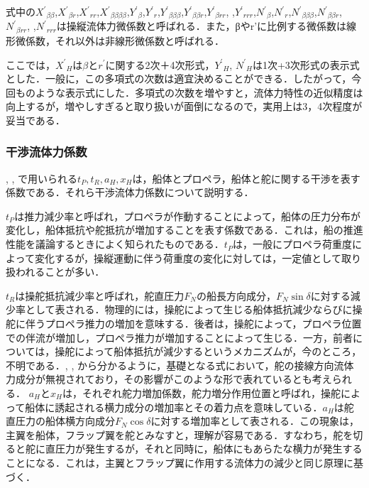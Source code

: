 式中の${X^{\prime}}_{\beta \beta}$,${X^{\prime}}_{\beta r}$,${X^{\prime}}_{r r}$,${X^{\prime}}_{\beta\beta\beta\beta}$,${Y^{\prime}}_{\beta}$,${Y^{\prime}}_{r}$,${Y^{\prime}}_{\beta \beta \beta}$,${Y^{\prime}}_{\beta \beta r}$,${Y^{\prime}}_{\beta r r}$, ,${Y^{\prime}}_{r r r}$,${N^{\prime}}_{\beta}$,${N^{\prime}}_{r}$,${N^{\prime}}_{\beta \beta \beta}$,${N^{\prime}}_{\beta \beta r}$,${N^{\prime}}_{\beta r r}$, ,${N^{\prime}}_{r r r}$は操縦流体力微係数と呼ばれる．また，βやr'に比例する微係数は線形微係数，それ以外は非線形微係数と呼ばれる．

ここでは，${X^{\prime}}_H$は$\beta$と$r^{\prime}$に関する2次＋4次形式，${Y^{\prime}}_H$, ${N^{\prime}}_H$は1次+3次形式の表示式とした．一般に，この多項式の次数は適宜決めることができる．したがって，今回ものような表示式にした．多項式の次数を増やすと，流体力特性の近似精度は向上するが，増やしすぎると取り扱いが面倒になるので，実用上は3，4次程度が妥当である．

\subsubsection{干渉流体力係数}

, , で用いられる$t_P,t_R,a_H,x_H$は，船体とプロペラ，船体と舵に関する干渉を表す係数である．それら干渉流体力係数について説明する．

$t_P$は推力減少率と呼ばれ，プロペラが作動することによって，船体の圧力分布が変化し，船体抵抗や舵抵抗が増加することを表す係数である．これは，船の推進性能を議論するときによく知られたものである．$t_P$は，一般にプロペラ荷重度によって変化するが，操縦運動に伴う荷重度の変化に対しては，一定値として取り扱われることが多い．

$t_R$は操舵抵抗減少率と呼ばれ，舵直圧力$F_N$の船長方向成分，$F_N  \sin{\delta}$に対する減少率として表される．物理的には，操舵によって生じる船体抵抗減少ならびに操舵に伴うプロペラ推力の増加を意味する．後者は，操舵によって，プロペラ位置での伴流が増加し，プロペラ推力が増加することによって生じる．一方，前者については，操舵によって船体抵抗が減少するというメカニズムが，今のところ，不明である．, , から分かるように，基礎となる式において，舵の接線方向流体力成分が無視されており，その影響がこのような形で表れているとも考えられる． 
$a_H$と$x_H$は，それぞれ舵力増加係数，舵力増分作用位置と呼ばれ，操舵によって船体に誘起される横力成分の増加率とその着力点を意味している．$a_H$は舵直圧力の船体横方向成分$F_N  \cos{\delta}$に対する増加率として表される．この現象は，主翼を船体，フラップ翼を舵とみなすと，理解が容易である．すなわち，舵を切ると舵に直圧力が発生するが，それと同時に，船体にもあらたな横力が発生することになる．これは，主翼とフラップ翼に作用する流体力の減少と同じ原理に基づく．

